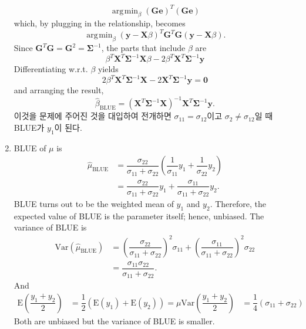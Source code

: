 \documentclass[answers]{exam}
\DeclareMathOperator{\argmin}{\arg\!\min}
\newcommand{\bs}{\boldsymbol}
\begin{document}
\begin{questions}
\begin{solution}
\begin{enumerate}
      $$
        \argmin_{\beta}\left(\bs{Ge}\right)^{T}\left(\bs{Ge}\right)
      $$
      which, by plugging in the relationship, becomes
      $$
        \argmin_{\beta}\left(\bs{y}-\bs{X}\beta\right)^{T}\bs{G}^{T}\bs{G}\left(\bs{y}-\bs{X}\beta\right).
      $$
      Since $\bs{G}^{T}\bs{G}=\bs{G}^{2}=\bs{\Sigma}^{-1}$, the parts that include $\beta$ are
      $$
        \beta^{T}\bs{X}^{T}\bs{\Sigma}^{-1}\bs{X}\beta -2\beta^{T}\bs{X}^{T}\bs{\Sigma}^{-1}\bs{y}
      $$
      Differentiating w.r.t. $\beta$ yields
      $$
        2\beta^{T}\bs{X}^{T}\bs{\Sigma}^{-1}\bs{X} -2\bs{X}^{T}\bs{\Sigma}^{-1}\bs{y}=\bs{0}
      $$
      and arranging the result,
      $$
        \hat{\beta}_{\text{BLUE}} = \left(\bs{X}^{T}\bs{\Sigma}^{-1}\bs{X}\right)^{-1}\bs{X}^{T}\bs{\Sigma}^{-1}\bs{y}.
      $$
      이것을 문제에 주어진 것을 대입하여 전개하면 $\sigma_{11}=\sigma_{12}$이고 $\sigma_{2}\neq \sigma_{12}$일 때 BLUE가 $y_{1}$이 된다.
      \item BLUE of $\mu$ is
      \begin{align}
        \hat{\mu}_{\text{BLUE}} &= \dfrac{\sigma_{22}}{\sigma_{11}+\sigma_{22}}\left(\dfrac{1}{\sigma_{11}}y_{1}+\dfrac{1}{\sigma_{22}}y_{2}\right)\\
        &= \dfrac{\sigma_{22}}{\sigma_{11}+\sigma_{22}}y_{1}+\dfrac{\sigma_{11}}{\sigma_{11}+\sigma_{22}}y_{2}.
      \end{align}
      BLUE turns out to be the weighted mean of $y_{1}$ and $y_{2}$. Therefore, the expected value of BLUE is the parameter itself; hence, unbiased. The variance of BLUE is
      \begin{align}
        \mathrm{Var}\left(\hat{\mu}_{\text{BLUE}}\right) &= \left(\dfrac{\sigma_{22}}{\sigma_{11}+\sigma_{22}}\right)^{2}\sigma_{11}+\left(\dfrac{\sigma_{11}}{\sigma_{11}+\sigma_{22}}\right)^{2}\sigma_{22}\\
        &= \dfrac{\sigma_{11}\sigma_{22}}{\sigma_{11}+\sigma_{22}}.
      \end{align}
      And
      \begin{align}
        \mathrm{E}\left(\dfrac{y_{1}+y_{2}}{2}\right) &= \dfrac{1}{2}\left(\mathrm{E}\left(y_{1}\right)+\mathrm{E}\left(y_{2}\right)\right) = \mu
        \mathrm{Var}\left(\dfrac{y_{1}+y_{2}}{2}\right) &= \dfrac{1}{4}\left(\sigma_{11}+\sigma_{22}\right)
      \end{align}
      Both are unbiased but the variance of BLUE is smaller.
    \end{enumerate}
   \end{solution}
   \question

\end{questions}
\end{document}
